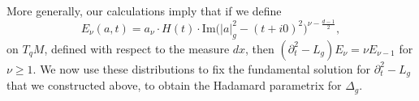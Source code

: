 More generally, our calculations imply that if we define
%
\[ E_\nu(a,t) = a_\nu \cdot H(t) \cdot \text{Im} \Big(|a|^2_g - (t + i0)^2 \Big)^{\nu - \frac{d-1}{2}}, \]
%
on $T_q M$, defined with respect to the measure $dx$, then $(\partial_t^2 - L_g) E_\nu = \nu E_{\nu-1}$ for $\nu \geq 1$. We now use these distributions to fix the fundamental solution for $\partial_t^2 - L_g$ that we constructed above, to obtain the Hadamard parametrix for $\Delta_g$.

%
%
%
%

%
%

%
%
%

